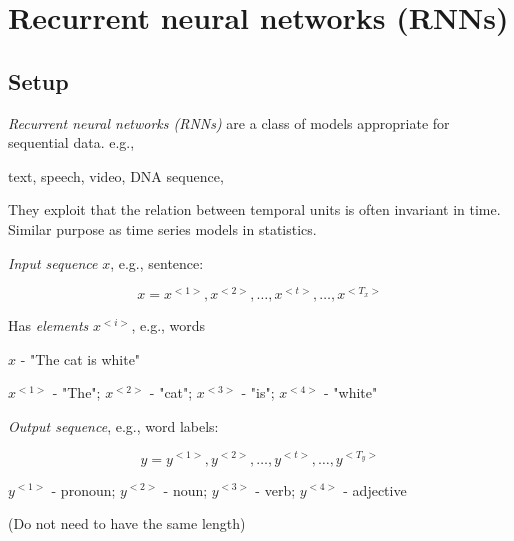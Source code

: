 \documentclass[english]{article}
\begin{document}
\eenum 








\section{Recurrent neural networks (RNNs)}
\subsection{Setup}
\benum
\item \emph{Recurrent neural networks (RNNs)} are a class of models appropriate for sequential data. e.g., 

text, speech, video, DNA sequence, 

They exploit that the relation between temporal units is often invariant in time. Similar purpose as time series models in statistics. 

\item 

\emph{Input sequence} $x$, e.g., sentence:  

$$x = x^{<1>}, x^{<2>}, \ldots, x^{<t>}, \ldots, x^{<T_x>}$$

Has \emph{elements} $x^{<i>}$, e.g., words

\benum 
\item 
$x$ - "The cat is white"
\item  $x^{<1>}$ - "The"; $x^{<2>}$ - "cat"; $x^{<3>}$ - "is"; $x^{<4>}$ - "white"
\eenum 

\emph{Output sequence}, e.g., word labels: 

$$y = y^{<1>}, y^{<2>}, \ldots, y^{<t>}, \ldots, y^{<T_y>}$$
\benum 
\item  $y^{<1>}$ - pronoun; $y^{<2>}$ - noun; $y^{<3>}$ - verb; $y^{<4>}$ - adjective
\eenum 


(Do not need to have the same length)

\end{document}
